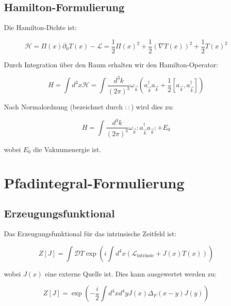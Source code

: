 \documentclass[12pt,a4paper]{article}
\newcommand{\Tfield}{T(x)}
\newcommand{\calL}{\mathcal{L}}
\begin{document}
	\subsection{Hamilton-Formulierung}
	\label{sec:hamilton}
	
	Die Hamilton-Dichte ist:
	
	\begin{equation}
		\mathcal{H} = \Pi(x)\partial_0 \Tfield - \calL = \frac{1}{2}\Pi(x)^2 + \frac{1}{2}(\nabla \Tfield)^2 + \frac{1}{2}\Tfield^2
	\end{equation}
	
	Durch Integration über den Raum erhalten wir den Hamilton-Operator:
	
	\begin{equation}
		H = \int d^3x \mathcal{H} = \int \frac{d^3k}{(2\pi)^3} \omega_{\vec{k}} \left(a_{\vec{k}}^{\dagger}a_{\vec{k}} + \frac{1}{2}[a_{\vec{k}}, a_{\vec{k}}^{\dagger}]\right)
	\end{equation}
	
	Nach Normalordnung (bezeichnet durch $::$) wird dies zu:
	
	\begin{equation}
		H = \int \frac{d^3k}{(2\pi)^3} \omega_{\vec{k}} :a_{\vec{k}}^{\dagger}a_{\vec{k}}: + E_0
	\end{equation}
	
	wobei $E_0$ die Vakuumenergie ist.
	
	\section{Pfadintegral-Formulierung}
	\label{sec:pfadintegral}
	
	\subsection{Erzeugungsfunktional}
	\label{sec:erzeugungsfunktional}
	
	Das Erzeugungsfunktional für das intrinsische Zeitfeld ist:
	
	\begin{equation}
		Z[J] = \int \mathcal{D}T \exp\left(i\int d^4x (\calL_{\text{intrinsic}} + J(x)\Tfield)\right)
	\end{equation}
	
	wobei $J(x)$ eine externe Quelle ist. Dies kann ausgewertet werden zu:
	
	\begin{equation}
		Z[J] = \exp\left(-\frac{i}{2}\int d^4x d^4y J(x)\Delta_F(x-y)J(y)\right)
	\end{equation}
	
\end{document}
